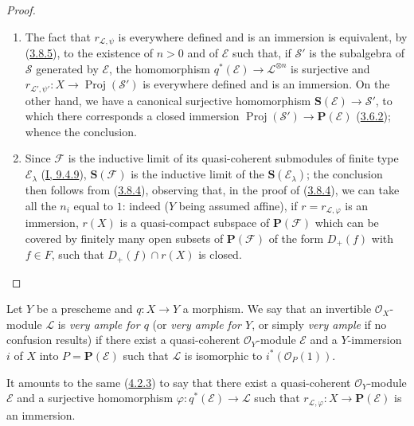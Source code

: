 \begin{proof}
\begin{enumerate}
  \item[\rm{(i)}] The fact that $r_{\mathcal{L},\psi}$ is everywhere defined
  and is an immersion is equivalent, by
  (\hyperref[II.3.8.5]{3.8.5}), to the existence of $n>0$ and of
  $\mathcal{E}$ such that, if $\mathcal{S}'$ is the subalgebra of
  $\mathcal{S}$ generated by $\mathcal{E}$, the homomorphism
  $q^*(\mathcal{E})\to\mathcal{L}^{\otimes n}$ is surjective and
  $r_{\mathcal{L}',\psi'}:X\to\operatorname{Proj}(\mathcal{S}')$ is everywhere
  defined and is an immersion. On the other hand, we have a canonical
  surjective homomorphism $\mathbf{S}(\mathcal{E})\to\mathcal{S}'$, to which
  there corresponds a closed immersion
  $\operatorname{Proj}(\mathcal{S}')\to\mathbf{P}(\mathcal{E})$
  (\hyperref[II.3.6.2]{3.6.2}); whence the conclusion.
  \item[\rm{(ii)}] Since $\mathcal{F}$ is the inductive limit of its
  quasi-coherent submodules of finite type $\mathcal{E}_\lambda$
  (\hyperref[I.9.4.9]{I, 9.4.9}), $\mathbf{S}(\mathcal{F})$ is the inductive
  limit of the $\mathbf{S}(\mathcal{E}_\lambda)$; the conclusion then follows
  from (\hyperref[II.3.8.4]{3.8.4}), observing that, in the
  proof of (\hyperref[II.3.8.4]{3.8.4}), we can take all the
  $n_i$ equal to $1$: indeed ($Y$ being assumed affine), if
  $r=r_{\mathcal{L},\varphi}$ is an immersion, $r(X)$ is a quasi-compact
  subspace of $\mathbf{P}(\mathcal{F})$ which can be covered by finitely
  many open subsets of $\mathbf{P}(\mathcal{F})$ of the form $D_+(f)$ with
  $f\in F$, such that $D_+(f)\cap r(X)$ is closed.
\end{enumerate}
\end{proof}

\begin{definition}[4.4.2]
\label{II.4.4.2}
Let $Y$ be a prescheme and $q:X\to Y$ a morphism. We say that an invertible
$\mathcal{O}_X$-module $\mathcal{L}$ is \emph{very ample for
$q$} (or \emph{very ample for $Y$}, or simply \emph{very ample} if
no confusion results) if there exist a quasi-coherent $\mathcal{O}_Y$-module
$\mathcal{E}$ and a $Y$-immersion $i$ of $X$ into
$P=\mathbf{P}(\mathcal{E})$ such that $\mathcal{L}$ is isomorphic to
$i^*(\mathcal{O}_P(1))$.
\end{definition}

It amounts to the same (\hyperref[II.4.2.3]{4.2.3}) to say that there exist a
quasi-coherent $\mathcal{O}_Y$-module $\mathcal{E}$ and a surjective
homomorphism $\varphi:q^*(\mathcal{E})\to\mathcal{L}$ such that
$r_{\mathcal{L},\varphi}:X\to\mathbf{P}(\mathcal{E})$ is an immersion.

